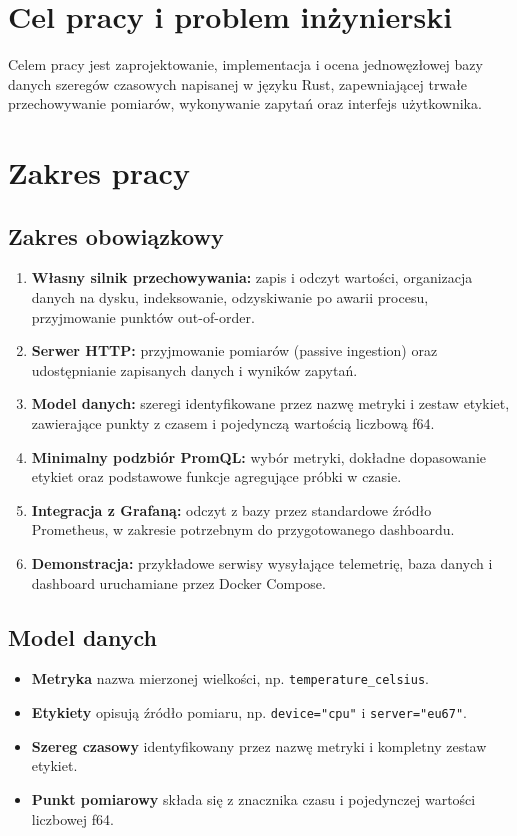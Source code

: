 \documentclass[12pt,a4paper]{article}
\begin{document}
\section{Cel pracy i problem inżynierski}

Celem pracy jest zaprojektowanie, implementacja i ocena jednowęzłowej bazy danych szeregów czasowych napisanej w języku Rust, zapewniającej trwałe przechowywanie pomiarów, wykonywanie zapytań oraz interfejs użytkownika.

\section{Zakres pracy}

\subsection{Zakres obowiązkowy}

\begin{enumerate}
    \item \textbf{Własny silnik przechowywania:} zapis i odczyt wartości, organizacja danych na dysku, indeksowanie, odzyskiwanie po awarii procesu, przyjmowanie punktów out-of-order.
    \item \textbf{Serwer HTTP:} przyjmowanie pomiarów (passive ingestion) oraz udostępnianie zapisanych danych i wyników zapytań.
    \item \textbf{Model danych:} szeregi identyfikowane przez nazwę metryki i zestaw etykiet, zawierające punkty z czasem i pojedynczą wartością liczbową f64.
    \item \textbf{Minimalny podzbiór PromQL:} wybór metryki, dokładne dopasowanie etykiet oraz podstawowe funkcje agregujące próbki w czasie.
    \item \textbf{Integracja z Grafaną:} odczyt z bazy przez standardowe źródło Prometheus, w zakresie potrzebnym do przygotowanego dashboardu.
    \item \textbf{Demonstracja:} przykładowe serwisy wysyłające telemetrię, baza danych i dashboard uruchamiane przez Docker Compose.
\end{enumerate}


\subsection{Model danych}

\begin{itemize}
    \item \textbf{Metryka} nazwa mierzonej wielkości, np. \texttt{temperature\_\allowbreak{}celsius}.
    \item \textbf{Etykiety} opisują źródło pomiaru, np. \texttt{device="cpu"} i \texttt{server="eu67"}.
    \item \textbf{Szereg czasowy} identyfikowany przez nazwę metryki i kompletny zestaw etykiet.
    \item \textbf{Punkt pomiarowy} składa się z znacznika czasu i pojedynczej wartości liczbowej f64.
\end{itemize}
\end{document}
